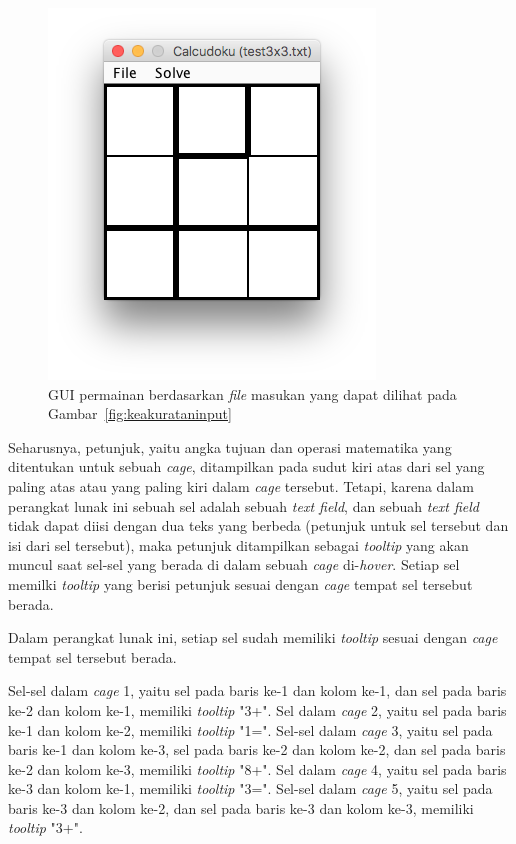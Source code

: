 \begin{enumerate}
\begin{figure}
\centering
\captionsetup{justification=centering}
\includegraphics[scale=0.5]{Gambar/ImplementasiPengujian/Output1.png}
\caption[GUI permainan berdasarkan \textit{file} masukan yang dapat dilihat pada Gambar~\ref{fig:keakurataninput}]{GUI permainan berdasarkan \textit{file} masukan yang dapat dilihat pada Gambar~\ref{fig:keakurataninput}}
\label{fig:keakuratanoutput}
\end{figure}

Seharusnya, petunjuk, yaitu angka tujuan dan operasi matematika yang ditentukan untuk sebuah \textit{cage}, ditampilkan pada sudut kiri atas dari sel yang paling atas atau yang paling kiri dalam \textit{cage} tersebut. Tetapi, karena dalam perangkat lunak ini sebuah sel adalah sebuah \textit{text field}, dan sebuah \textit{text field} tidak dapat diisi dengan dua teks yang berbeda (petunjuk untuk sel tersebut dan isi dari sel tersebut), maka petunjuk ditampilkan sebagai \textit{tooltip} yang akan muncul saat sel-sel yang berada di dalam sebuah \textit{cage} di-\textit{hover}. Setiap sel memilki \textit{tooltip} yang berisi petunjuk sesuai dengan \textit{cage} tempat sel tersebut berada. 

Dalam perangkat lunak ini, setiap sel sudah memiliki \textit{tooltip} sesuai dengan \textit{cage} tempat sel tersebut berada. 

Sel-sel dalam \textit{cage} 1, yaitu sel pada baris ke-1 dan kolom ke-1, dan sel pada baris ke-2 dan kolom ke-1, memiliki \textit{tooltip} "3+". Sel dalam \textit{cage} 2, yaitu sel pada baris ke-1 dan kolom ke-2, memiliki \textit{tooltip} "1=". Sel-sel dalam \textit{cage} 3, yaitu sel pada baris ke-1 dan kolom ke-3, sel pada baris ke-2 dan kolom ke-2, dan sel pada baris ke-2 dan kolom ke-3, memiliki \textit{tooltip} "8+". Sel dalam \textit{cage} 4, yaitu sel pada baris ke-3 dan kolom ke-1, memiliki \textit{tooltip} "3=". Sel-sel dalam \textit{cage} 5, yaitu sel pada baris ke-3 dan kolom ke-2, dan sel pada baris ke-3 dan kolom ke-3, memiliki \textit{tooltip} "3+".


\end{enumerate}
